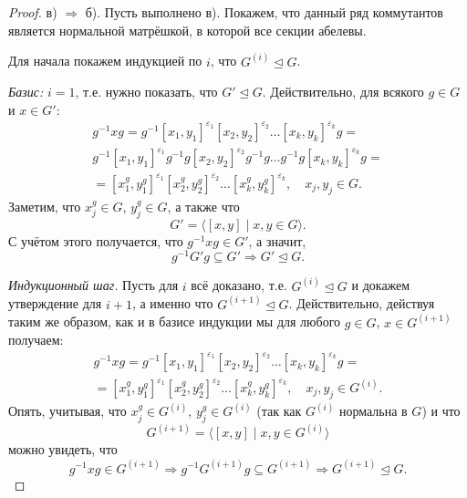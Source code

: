 \documentclass{article}
\begin{document}
\begin{proof}
    в) $\Rightarrow$ б). Пусть выполнено в). Покажем, что данный ряд коммутантов является нормальной матрёшкой, в которой все секции абелевы.
    
    Для начала покажем индукцией по $i$, что $G^{(i)} \trianglelefteq G$.
    
    \textit{Базис:} $i = 1$, т.е. нужно показать, что $G' \trianglelefteq G$. Действительно, для всякого $g \in G$ и $x \in G'$:
    \begin{gather*}
        g^{-1} x g = g^{-1} [x_1, y_1]^{\varepsilon_1} [x_2, y_2]^{\varepsilon_2} \ldots [x_k, y_k]^{\varepsilon_k} g = \\
        g^{-1} [x_1, y_1]^{\varepsilon_1} g^{-1} g [x_2, y_2]^{\varepsilon_2} g^{-1} g \ldots g^{-1} g [x_k, y_k]^{\varepsilon_k} g = \\
        = [x_1^g, y_1^g]^{\varepsilon_1} [x_2^g, y_2^g]^{\varepsilon_2} \ldots [x_k^g, y_k^g]^{\varepsilon_k}, \quad x_j, y_j \in G.
    \end{gather*}
    Заметим, что $x_j^g \in G$, $y_j^g \in G$, а также что $$ G' = \langle [x, y] \mid x,y \in G \rangle. $$
    С учётом этого получается, что $g^{-1} x g \in G'$, а значит, $$ g^{-1} G' g \subseteq G' \Rightarrow G' \trianglelefteq G. $$

    \textit{Индукционный шаг.} Пусть для $i$ всё доказано, т.е. $G^{(i)} \trianglelefteq G$ и докажем утверждение для $i + 1$, а именно что $G^{(i + 1)} \trianglelefteq G$.
    Действительно, действуя таким же образом, как и в базисе индукции мы для любого $g \in G$, $x \in G^{(i + 1)}$ получаем:
    \begin{gather*}
        g^{-1} x g = g^{-1} [x_1, y_1]^{\varepsilon_1} [x_2, y_2]^{\varepsilon_2} \ldots [x_k, y_k]^{\varepsilon_k} g = \\
        = [x_1^g, y_1^g]^{\varepsilon_1} [x_2^g, y_2^g]^{\varepsilon_2} \ldots [x_k^g, y_k^g]^{\varepsilon_k}, \quad x_j, y_j \in G^{(i)}.
    \end{gather*}
    Опять, учитывая, что $x_j^g \in G^{(i)}$, $y_j^g \in G^{(i)}$ (так как $G^{(i)}$ нормальна в $G$) и что $$ G^{(i + 1)} = \langle [x, y] \mid x, y \in G^{(i)} \rangle $$
    можно увидеть, что $$ g^{-1} x g \in G^{(i + 1)} \Rightarrow g^{-1} G^{(i + 1)} g \subseteq G^{(i + 1)} \Rightarrow G^{(i + 1)} \trianglelefteq G. $$


\end{proof}
\end{document}
